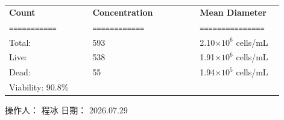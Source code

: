 \documentclass[UTF8,10pt,a4paper,fontset=fandol]{ctexart}
\newcommand{\fieldvalue}[1]{#1}
\newcommand{\handwritten}[1]{#1}
\begin{document}
\medskip
\noindent
\begin{tabular}{@{}p{0.28\linewidth}p{0.36\linewidth}p{0.28\linewidth}@{}}
\textbf{Count} & \textbf{Concentration} & \textbf{Mean Diameter} \\
\texttt{===========} & \texttt{============} & \texttt{===============} \\

Total: &
\fieldvalue{593}
&
\fieldvalue{2.10$\times 10^{6}$ cells/mL}
\\

Live: &
\fieldvalue{538}
&
\fieldvalue{1.91$\times 10^{6}$ cells/mL}
\\

Dead: &
\fieldvalue{55}
&
\fieldvalue{1.94$\times 10^{5}$ cells/mL}
\\

Viability: %
\fieldvalue{90.8\%}
&
&
\end{tabular}

\bigskip

\begin{center}
\setlength{\fboxsep}{6pt}
\hspace{0.04\linewidth}

\vspace{0.03\textheight}

\hspace{0.04\linewidth}
\end{center}

\vfill

\noindent 操作人：%
\fieldvalue{\handwritten{程冰}}
\hfill
日期：%
\fieldvalue{\handwritten{2026.07.29}}
\end{document}
